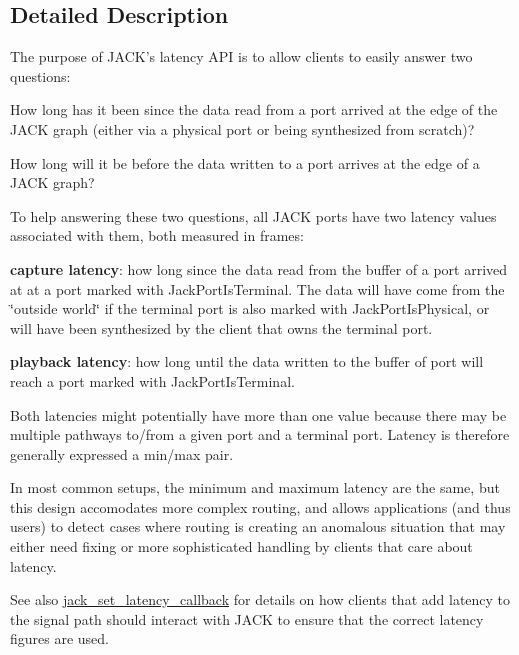 \subsection{\-Detailed \-Description}
\-The purpose of \-J\-A\-C\-K's latency \-A\-P\-I is to allow clients to easily answer two questions\-:


\begin{DoxyItemize}
\item \-How long has it been since the data read from a port arrived at the edge of the \-J\-A\-C\-K graph (either via a physical port or being synthesized from scratch)?
\end{DoxyItemize}


\begin{DoxyItemize}
\item \-How long will it be before the data written to a port arrives at the edge of a \-J\-A\-C\-K graph?
\end{DoxyItemize}

\-To help answering these two questions, all \-J\-A\-C\-K ports have two latency values associated with them, both measured in frames\-:

{\bfseries capture latency}\-: how long since the data read from the buffer of a port arrived at at a port marked with \-Jack\-Port\-Is\-Terminal. \-The data will have come from the \char`\"{}outside
                  world\char`\"{} if the terminal port is also marked with \-Jack\-Port\-Is\-Physical, or will have been synthesized by the client that owns the terminal port.

{\bfseries playback latency}\-: how long until the data written to the buffer of port will reach a port marked with \-Jack\-Port\-Is\-Terminal.

\-Both latencies might potentially have more than one value because there may be multiple pathways to/from a given port and a terminal port. \-Latency is therefore generally expressed a min/max pair.

\-In most common setups, the minimum and maximum latency are the same, but this design accomodates more complex routing, and allows applications (and thus users) to detect cases where routing is creating an anomalous situation that may either need fixing or more sophisticated handling by clients that care about latency.

\-See also \hyperlink{jack_8h_a70a38fb1e74c5e9df9f1305c695c58bf}{jack\-\_\-set\-\_\-latency\-\_\-callback} for details on how clients that add latency to the signal path should interact with \-J\-A\-C\-K to ensure that the correct latency figures are used. 

